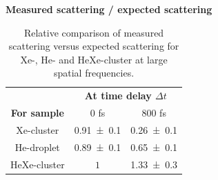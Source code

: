 \begin{table}%
\centering
\textbf{Measured scattering / expected scattering}\\
\begin{tabular}{ | c || c | c | }
\hline
	 &\multicolumn{2}{c|}{\textbf{At time delay $\Delta t$}} \\
	\textbf{For sample} & 0 fs  & 800 fs \\ \hline \hline
	Xe-cluster & \num{0.91 \pm 0.1} & \num{0.26 \pm 0.1} \\ \hline
	He-droplet & \num{0.89 \pm 0.1} & \num{0.65\pm  0.1} \\ \hline
	HeXe-cluster & $1$ & \num{1.33 \pm 0.3} \\ \hline
\end{tabular}
\caption[Relative comparison of measured scattering versus expected scattering.]{Relative comparison of measured scattering versus expected scattering for Xe-, He- and HeXe-cluster at large spatial frequencies.}
\label{tab:he-vs-xe-vs-hexe-summary}
\end{table}
